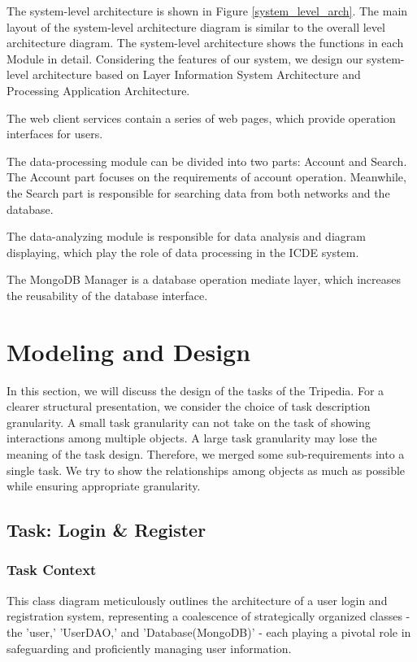 \documentclass[conference]{IEEEtran}
\begin{document}
The system-level architecture is shown in Figure \ref{system_level_arch}. The main layout of the system-level architecture diagram is similar to the overall level architecture diagram. The system-level architecture shows the functions in each Module in detail. Considering the features of our system, we design our system-level architecture based on Layer Information System Architecture and Processing Application Architecture.

The web client services contain a series of web pages, which provide operation interfaces for users.

The data-processing module can be divided into two parts: Account and Search. The Account part focuses on the requirements of account operation. Meanwhile, the Search part is responsible for searching data from both networks and the database.

The data-analyzing module is responsible for data analysis and diagram displaying, which play the role of data processing in the ICDE system.

The MongoDB Manager is a database operation mediate layer, which increases the reusability of the database interface.

\section{\textbf{Modeling and Design}}

In this section, we will discuss the design of the tasks of the Tripedia. For a clearer structural presentation, we consider the choice of task description granularity. A small task granularity can not take on the task of showing interactions among multiple objects. A large task granularity may lose the meaning of the task design. Therefore, we merged some sub-requirements into a single task. We try to show the relationships among objects as much as possible while ensuring appropriate granularity. 

\subsection{\textbf{Task: Login \& Register }}

\subsubsection{\textbf{Task Context }}
\textbf{}

This class diagram meticulously outlines the architecture of a user login and registration system, representing a coalescence of strategically organized classes - the 'user,' 'UserDAO,' and 'Database(MongoDB)' - each playing a pivotal role in safeguarding and proficiently managing user information.
\end{document}
